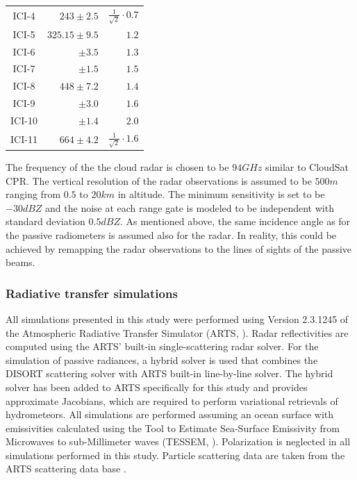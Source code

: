 \documentclass[journal abbreviation, manuscript]{copernicus}
\begin{document}
\begin{table}[hbpt]
\begin{tabular}{c|r|r}
    ICI-4  & $243    \pm 2.5$ & $\frac{1}{\sqrt{2}} \cdot 0.7$\\
    ICI-5  & $325.15 \pm 9.5$ & $1.2$\\
    ICI-6  & $       \pm 3.5$ & $1.3$\\
    ICI-7  & $       \pm 1.5$ & $1.5$\\
    ICI-8  & $448    \pm 7.2$ & $1.4$\\
    ICI-9  & $       \pm 3.0$ & $1.6$\\
    ICI-10 & $       \pm 1.4$ & $2.0$\\
    ICI-11 & $664    \pm 4.2$ & $\frac{1}{\sqrt{2}} \cdot 1.6$\\
    \end{tabular}
\end{table}

The frequency of the the cloud radar is chosen to be $94\unit{GHz}$ similar to
CloudSat CPR. The vertical resolution of the radar observations is assumed to be
$500\unit{m}$ ranging from $0.5$ to $20\unit{km}$ in altitude. The minimum
sensitivity is set to be $-30\unit{dBZ}$ and the noise at each range gate is
modeled to be independent with standard deviation $0.5\unit{dBZ}$. As mentioned above,
the same incidence angle as for the passive radiometers is assumed also for the
radar. In reality, this could be achieved by remapping the radar observations to
the lines of sights of the passive beams.

\subsubsection{Radiative transfer simulations}
\label{sec:orge741b86}

All simulations presented in this study were performed using Version 2.3.1245 of
the Atmospheric Radiative Transfer Simulator (ARTS, \cite{arts18}). Radar
reflectivities are computed using the ARTS' built-in single-scattering radar
solver. For the simulation of passive radiances, a hybrid solver is used that
combines the DISORT scattering solver with ARTS built-in line-by-line solver.
The hybrid solver has been added to ARTS specifically for this study and
provides approximate Jacobians, which are required to perform variational
retrievals of hydrometeors. All simulations are performed assuming an
ocean surface with emissivities calculated using the Tool to Estimate
Sea‐Surface Emissivity from Microwaves to sub‐Millimeter waves (TESSEM,
\cite{prigent16}). Polarization is neglected in all simulations performed in
this study. Particle scattering data are taken from the ARTS scattering data base
\citep{eriksson18}.
\end{document}
